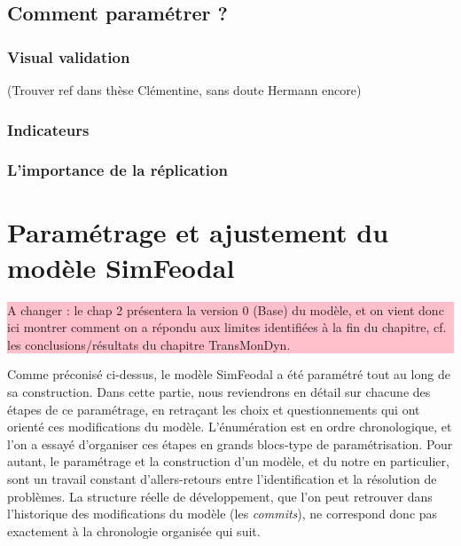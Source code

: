 \documentclass[12pt, a4paper, oneside]{book}
\begin{document}
	
	\subsection{Comment paramétrer ?}
	
	
	
	
	
	\subsubsection{Visual validation}
	
	(Trouver ref dans thèse Clémentine, sans doute Hermann encore)
	
	\subsubsection{Indicateurs}
	
	\subsubsection{L'importance de la réplication}
	
	
	\section[Paramétrage et ajustement]{Paramétrage et ajustement du modèle SimFeodal}
	
	\colorbox{pink}{\parbox{0.9\textwidth}{%
			\vskip5pt
			A changer : le chap 2 présentera la version 0 (Base) du modèle, et on vient donc ici montrer comment on a répondu aux limites identifiées à la fin du chapitre, cf. les conclusions/résultats du chapitre TransMonDyn.
			\vskip5pt
		}
	}
	
	Comme préconisé ci-dessus, le modèle SimFeodal a été paramétré tout au long de sa construction. Dans cette partie, nous reviendrons en détail sur chacune des étapes de ce paramétrage, en retraçant les choix et questionnements qui ont orienté ces modifications du modèle. L'énumération est en ordre chronologique, et l'on a essayé d'organiser ces étapes en grands blocs-type de paramétrisation. Pour autant, le paramétrage et la construction d'un modèle, et du notre en particulier, sont un travail constant d'allers-retours entre l'identification et la résolution de problèmes. La structure réelle de développement, que l'on peut retrouver dans l'historique des modifications du modèle (les \og \textit{commits}\fg{}), ne correspond donc pas exactement à la chronologie organisée qui suit.
	
\end{document}
